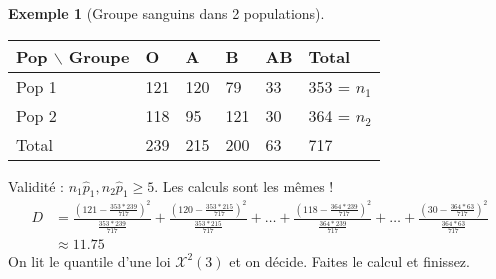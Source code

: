 \documentclass{article}
\theoremstyle{plain}%
\theoremstyle{definition}
\newtheorem{exmp}{Exemple}[section]
\theoremstyle{remark}
\begin{document}
\begin{exmp}[Groupe sanguins dans 2 populations]
    \begin{table}[!h]
        \centering
        \begin{tabular}{|l|l|l|l|l|l|}
        \hline
            Pop $\backslash$ Groupe & O & A & B & AB & Total \\ \hline
            Pop 1 & 121 & 120 & 79 & 33 & 353 = $n_1$ \\ \hline
            Pop 2 & 118 & 95 & 121 & 30 & 364 = $n_2$ \\ \hline
            Total & 239 & 215 & 200 & 63 & 717 \\ \hline
        \end{tabular}
    \end{table}
    Validité : $ n_1 \hat{p}_1, n_2 \hat{p}_1 \geq 5 $. Les calculs sont les mêmes ! 
    \begin{align*}
        D &= \frac{(121 - \frac{353*239}{717})^2}{\frac{353*239}{717}} + \frac{(120 - \frac{353*215}{717})^2}{\frac{353*215}{717}} + \dots + \frac{(118 - \frac{364*239}{717})^2}{\frac{364*239}{717}} + \dots + \frac{(30 - \frac{364*63}{717})^2}{\frac{364*63}{717}} \\
        & \approx  11.75
    \end{align*}
    On lit le quantile d'une loi $ \mathcal{X}^2 (3)$ et on décide. Faites le calcul et finissez. 
\end{exmp}
\end{document}

